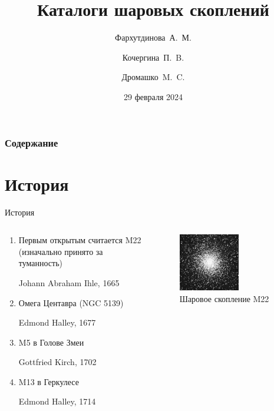 \documentclass{beamer}
\begin{document}
\title{Каталоги шаровых скоплений}
\author[Фархутдинова, Кочергина, Дромашко]{Фархутдинова~А.~М. \and Кочергина~П.~B. \and Дромашко~M.~C.}
\date{29 февраля 2024}
\maketitle
\begin{frame}
    \frametitle{Содержание}
    \tableofcontents
\end{frame}
    \section{История}
    \begin{frame}{История}
        \begin{columns}
            \begin{column}{0.6\textwidth}
                    \begin{enumerate}[]
                        \item Первым открытым считается M22 (изначально принято за туманность) \par Johann Abraham Ihle, 1665
                        \item Омега Центавра (NGC 5139) \par Edmond Halley, 1677
                        \item M5 в Голове Змеи \par Gottfried Kirch, 1702
                        \item M13 в Геркулесе \par Edmond Halley, 1714
                    \end{enumerate}
            \end{column}
            \begin{column}{0.4\textwidth}
                \begin{figure}
                \centering
                    \includegraphics[width=0.6\textwidth]{pictures/m22.jpg}
                    \caption{Шаровое скопление M22}
                \end{figure}
            \end{column}
        \end{columns}
    \end{frame}
\end{document}
